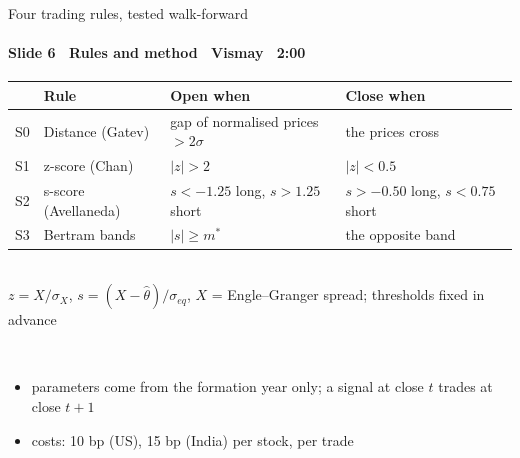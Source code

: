 \begin{frame}{Four trading rules, tested walk-forward}
\framesubtitle{Slide 6 \textbullet\ Rules and method \textbullet\ Vismay \textbullet\ 2:00}
\vspace{-2pt}
\scriptsize\setlength{\tabcolsep}{3pt}
\begin{tabular}{@{}l@{\ }p{3.7cm}p{4.3cm}p{4.3cm}@{}}
  \toprule
  & Rule & Open when & Close when \\
  \midrule
  S0 & Distance (Gatev) & gap of normalised prices $>2\sigma$ & the prices cross \\
  S1 & z-score (Chan) & $|z|>2$ & $|z|<0.5$ \\
  S2 & s-score (Avellaneda) & $s<-1.25$ long, $s>1.25$ short & $s>-0.50$ long, $s<0.75$ short \\
  S3 & Bertram bands & $|s|\ge m^*$ & the opposite band \\
  \bottomrule
\end{tabular}\\[2pt]
{\scriptsize $z=X/\sigma_X$, $s=(X-\hat\theta)/\sigma_{eq}$, $X$ = Engle--Granger spread; thresholds fixed in advance}
\par\vspace{3pt}
\centering
{}\\[2pt]
\footnotesize\raggedright
\begin{itemize}\setlength{\itemsep}{1pt}
  \item parameters come from the formation year only; a signal at close $t$ trades at close $t+1$
  \item costs: 10 bp (US), 15 bp (India) per stock, per trade
\end{itemize}
\end{frame}
